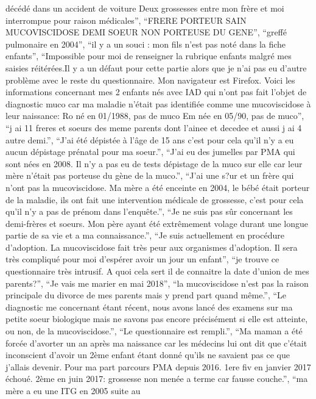 \documentclass[
  letterpaper,
  DIV=11,
  numbers=noendperiod]{scrartcl}
\begin{document}
\begin{itemize}
  décédé dans un accident de voiture Deux grossesses entre mon frère et
  moi interrompue pour raison médicales'', ``FRERE PORTEUR SAIN
  MUCOVISCIDOSE DEMI SOEUR NON PORTEUSE DU GENE'', ``greffé pulmonaire
  en 2004'', ``il y a un souci : mon fils n'est pas noté dans la fiche
  enfants'', ``Impossible pour moi de renseigner la rubrique enfants
  malgré mes saisies réitérées.Il y a un défaut pour cette partie alors
  que je n'ai pas eu d'autre problème avec le reste du questionnaire.
  Mon navigateur est Firefox. Voici les informations concernant mes 2
  enfants nés avec IAD qui n'ont pas fait l'objet de diagnostic muco car
  ma maladie n'était pas identifiée comme une mucoviscidose à leur
  naissance: Ro né en 01/1988, pas de muco Em née en 05/90, pas de
  muco'', ``j ai 11 freres et soeurs des meme parents dont l'ainee et
  decedee et aussi j ai 4 autre demi.'', ``J'ai été dépistée à l'âge de
  15 ans c'est pour cela qu'il n'y a eu aucun dépistage prénatal pour ma
  soeur.'', ``J'ai eu des jumelles par PMA qui sont nées en 2008. Il n'y
  a pas eu de tests dépistage de la muco sur elle car leur mère n'était
  pas porteuse du gène de la muco.'', ``J'ai une s?ur et un frère qui
  n'ont pas la mucoviscidose. Ma mère a été enceinte en 2004, le bébé
  était porteur de la maladie, ils ont fait une intervention médicale de
  grossesse, c'est pour cela qu'il n'y a pas de prénom dans
  l'enquête.'', ``Je ne suis pas sûr concernant les demi-frères et
  soeurs. Mon père ayant été extrêmement volage durant une longue partie
  de sa vie et a ma connaissance.'', ``Je suis actuellement en procédure
  d'adoption. La mucoviscidose fait très peur aux organismes d'adoption.
  Il sera très compliqué pour moi d'espérer avoir un jour un enfant'',
  ``je trouve ce questionnaire très intrusif. A quoi cela sert il de
  connaitre la date d'union de mes parents?'', ``Je vais me marier en
  mai 2018'', ``la mucoviscidose n'est pas la raison principale du
  divorce de mes parents mais y prend part quand même.'', ``Le
  diagnostic me concernant étant récent, nous avons lancé des examens
  sur ma petite soeur biologique mais ne savons pas encore précisément
  si elle est atteinte, ou non, de la mucoviscidose.'', ``Le
  questionnaire est rempli.'', ``Ma maman a été forcée d'avorter un an
  après ma naissance car les médecins lui ont dit que c'était
  inconscient d'avoir un 2ème enfant étant donné qu'ils ne savaient pas
  ce que j'allais devenir. Pour ma part parcours PMA depuis 2016. 1ere
  fiv en janvier 2017 échoué. 2ème en juin 2017: grossesse non menée a
  terme car fausse couche.'', ``ma mère a eu une ITG en 2005 suite au

\end{itemize}
\end{document}

